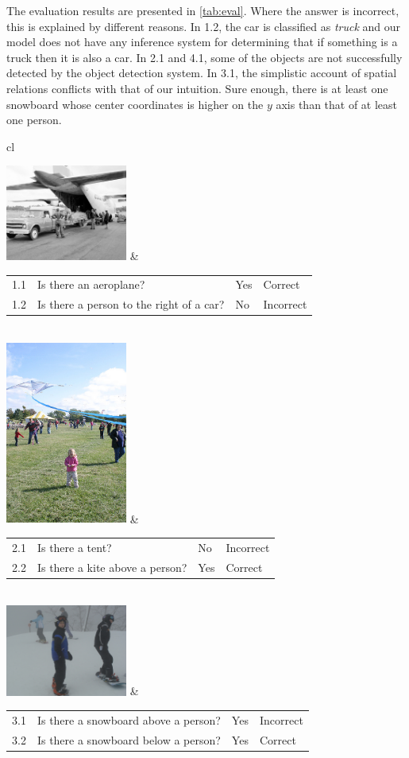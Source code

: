 The evaluation results are presented in \autoref{tab:eval}.
Where the answer is incorrect, this is explained by different reasons.
In 1.2, the car is classified as \textit{truck} and our model does not have any inference system for determining that if something is a truck then it is also a car.
In 2.1 and 4.1, some of the objects are not successfully detected by the object detection system.
In 3.1, the simplistic account of spatial relations conflicts with that of our intuition.
Sure enough, there is at least one snowboard whose center coordinates is higher on the $y$ axis than that of at least one person.

\begin{table}
\begin{tabular}{cl}
  
	\includegraphics[width=0.3\textwidth]{vqa1.jpg} &
	\begin{tabular}{llll}
		1.1 & Is there an aeroplane? & Yes & Correct \\
		1.2 & Is there a person to the right of a car? & No & Incorrect
		\end{tabular} \\
		
	\includegraphics[width=0.3\textwidth]{vqa2.jpg} &
	\begin{tabular}{llll}
		2.1 & Is there a tent? & No & Incorrect \\
		2.2 & Is there a kite above a person? & Yes & Correct
		\end{tabular} \\
		
	\includegraphics[width=0.3\textwidth]{vqa3.jpg} &
	\begin{tabular}{llll}
		3.1 & Is there a snowboard above a person? & Yes & Incorrect \\
		3.2 & Is there a snowboard below a person? & Yes & Correct
		\end{tabular} \\
		

\end{tabular}
\end{table}
